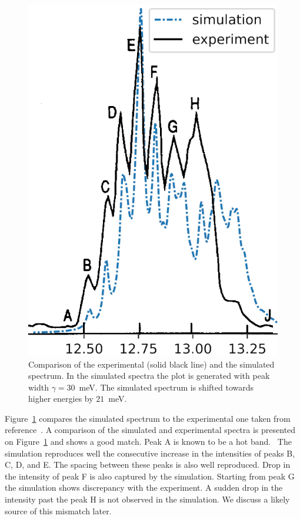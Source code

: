 \documentclass[12pt,prb,aps]{revtex4-2}
\begin{document}
\begin{figure}
\includegraphics[width = 8 cm]{figures/sim_vs_Dyke}
\caption{
    Comparison of the experimental (solid black line) and the simulated
    spectrum. In the simulated spectra the plot is generated with peak width
    $\gamma = 30$~meV. The simulated spectrum is shifted towards higher
    energies by $21$~meV.
}
\label{fig:sim_vs_dyke}
\end{figure}

Figure~\ref{fig:sim_vs_dyke} compares the simulated spectrum to the
experimental one taken from reference~\cite{dyke:O3:74}. A comparison of the
simulated and experimental spectra is presented on
Figure~\ref{fig:sim_vs_dyke} and shows a good match. Peak A is known to be a
hot band.~\cite{KDC:O3:92} The simulation reproduces well the consecutive
increase in the intensities of peaks B, C, D, and E. The spacing between these
peaks is also well reproduced. Drop in the intensity of peak F is also
captured by the simulation. Starting from peak G the simulation shows
discrepancy with the experiment. A sudden drop in the intensity past the peak
H is not observed in the simulation. We discuss a likely source of this
mismatch later.
\end{document}
